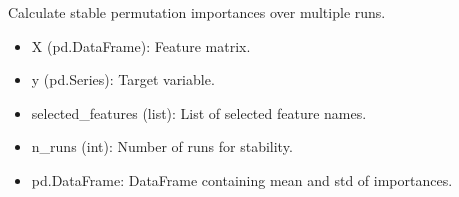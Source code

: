 \documentclass[letterpaper,10pt,english]{sphinxmanual}
\begin{document}

\begin{fulllineitems}
\label{\detokenize{eda:eda.permutation_importance_stable}}
\pysigstartsignatures
{}
\pysigstopsignatures
\sphinxAtStartPar
Calculate stable permutation importances over multiple runs.
\begin{description}
\begin{itemize}
\item {} 
\sphinxAtStartPar
X (pd.DataFrame): Feature matrix.

\item {} 
\sphinxAtStartPar
y (pd.Series): Target variable.

\item {} 
\sphinxAtStartPar
selected\_features (list): List of selected feature names.

\item {} 
\sphinxAtStartPar
n\_runs (int): Number of runs for stability.

\end{itemize}

\begin{itemize}
\item {} 
\sphinxAtStartPar
pd.DataFrame: DataFrame containing mean and std of importances.

\end{itemize}

\end{description}

\end{fulllineitems}

\end{document}
